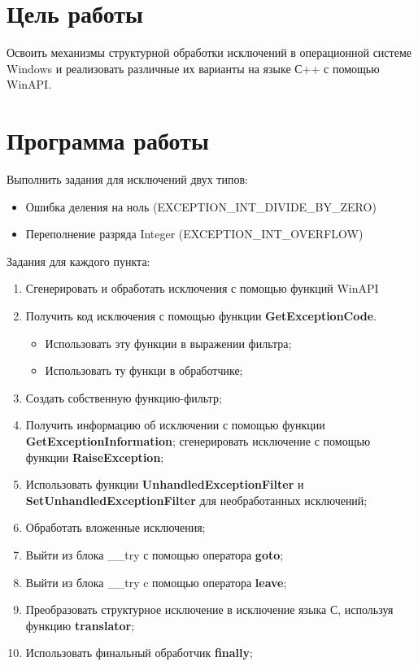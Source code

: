 


    

    


    \section{Цель работы}
    Освоить механизмы структурной обработки исключений в операционной системе Windows и реализовать различные их варианты на языке С++ с помощью WinAPI.

    \section{Программа работы}
    Выполнить задания для исключений двух типов:
    \begin{itemize}
        \item Ошибка деления на ноль (EXCEPTION\_INT\_DIVIDE\_BY\_ZERO)
        \item Переполнение разряда Integer (EXCEPTION\_INT\_OVERFLOW)
    \end{itemize}

    Задания для каждого пункта:
    \begin{enumerate}
        \item Сгенерировать и обработать исключения с помощью функций WinAPI
        \item Получить код исключения с помощью функции \textbf{GetExceptionCode}.
        \begin{itemize}
            \item Использовать эту функции в выражении фильтра;
            \item Использовать ту функци в обработчике;
        \end{itemize}
        \item Создать собственную функцию-фильтр;
        \item Получить информацию об исключении с помощью функции \textbf{GetExceptionInformation}; сгенерировать исключение с помощью функции \textbf{RaiseException};
        \item Использовать функции \textbf{UnhandledExceptionFilter} и \textbf{SetUnhandledExceptionFilter} для необработанных исключений;
        \item Обработать вложенные исключения;
        \item Выйти из блока \_\_try с помощью оператора \textbf{goto};
        \item Выйти из блока \_\_try c помощью оператора \textbf{leave};
        \item Преобразовать структурное исключение в исключение языка С, используя функцию \textbf{translator};
        \item Использовать финальный обработчик \textbf{finally};
    \end{enumerate}

